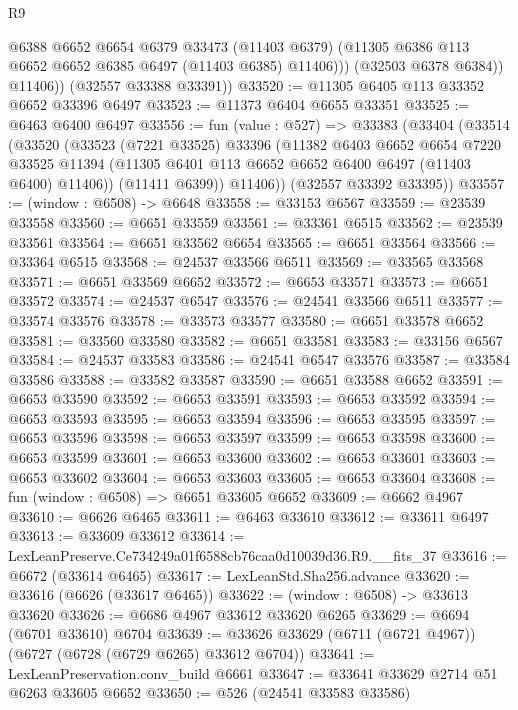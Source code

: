 \begin{lexlean}{R9}
\begin{coremodule}
                @6388
                @6652
                @6654
                @6379
                @33473
                (@11403 @6379)
                (@11305 @6386 @113 @6652 @6652 @6385 @6497 (@11403 @6385) @11406)))
            (@32503 @6378 @6384))
          @11406))
      (@32557 @33388 @33391))
@33520 := @11305 @6405 @113 @33352 @6652 @33396 @6497
@33523 := @11373 @6404 @6655 @33351
@33525 := @6463 @6400 @6497
@33556 := fun (value : @527) =>
  @33383
    (@33404
      (@33514
        (@33520
          (@33523
            (@7221 @33525)
            @33396
            (@11382
              @6403
              @6652
              @6654
              @7220
              @33525
              @11394
              (@11305 @6401 @113 @6652 @6652 @6400 @6497 (@11403 @6400) @11406))
            (@11411 @6399))
          @11406))
      (@32557 @33392 @33395))
@33557 := (window : @6508) -> @6648
@33558 := @33153 @6567
@33559 := @23539 @33558
@33560 := @6651 @33559
@33561 := @33361 @6515
@33562 := @23539 @33561
@33564 := @6651 @33562 @6654
@33565 := @6651 @33564
@33566 := @33364 @6515
@33568 := @24537 @33566 @6511
@33569 := @33565 @33568
@33571 := @6651 @33569 @6652
@33572 := @6653 @33571
@33573 := @6651 @33572
@33574 := @24537 @6547
@33576 := @24541 @33566 @6511
@33577 := @33574 @33576
@33578 := @33573 @33577
@33580 := @6651 @33578 @6652
@33581 := @33560 @33580
@33582 := @6651 @33581
@33583 := @33156 @6567
@33584 := @24537 @33583
@33586 := @24541 @6547 @33576
@33587 := @33584 @33586
@33588 := @33582 @33587
@33590 := @6651 @33588 @6652
@33591 := @6653 @33590
@33592 := @6653 @33591
@33593 := @6653 @33592
@33594 := @6653 @33593
@33595 := @6653 @33594
@33596 := @6653 @33595
@33597 := @6653 @33596
@33598 := @6653 @33597
@33599 := @6653 @33598
@33600 := @6653 @33599
@33601 := @6653 @33600
@33602 := @6653 @33601
@33603 := @6653 @33602
@33604 := @6653 @33603
@33605 := @6653 @33604
@33608 := fun (window : @6508) => @6651 @33605 @6652
@33609 := @6662 @4967
@33610 := @6626 @6465
@33611 := @6463 @33610
@33612 := @33611 @6497
@33613 := @33609 @33612
@33614 := LexLeanPreserve.Ce734249a01f6588cb76caa0d10039d36.R9.__fits_37
@33616 := @6672 (@33614 @6465)
@33617 := LexLeanStd.Sha256.advance
@33620 := @33616 (@6626 (@33617 @6465))
@33622 := (window : @6508) -> @33613 @33620
@33626 := @6686 @4967 @33612 @33620 @6265
@33629 := @6694 (@6701 @33610) @6704
@33639 := @33626 @33629 (@6711 (@6721 @4967)) (@6727 (@6728 (@6729 @6265) @33612 @6704))
@33641 := LexLeanPreservation.conv_build @6661
@33647 := @33641 @33629 @2714 @51 @6263 @33605 @6652
@33650 := @526 (@24541 @33583 @33586)

\end{coremodule}
\end{lexlean}
